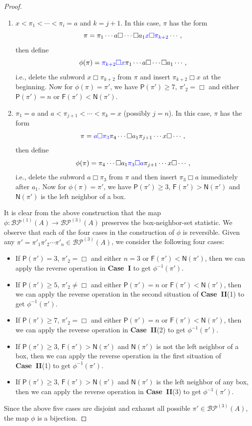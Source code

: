 \documentclass[12pt]{amsart}
\numberwithin{equation}{section}
\def\blue{\textcolor{blue}}
\theoremstyle{plain}
\theoremstyle{definition}
\newcommand{\BP}{\mathcal{BP}}
\begin{document}
\begin{proof}
\begin{enumerate}
\item $x<\pi_1<\cdots<\pi_i=a$ and $k=j+1$. In this case, $\pi$ has the form
$$
\pi=\pi_1\cdots a\Box\cdots \Box a_1\blue{x\Box\pi_{k+2}}\cdots,
$$
then define 
$$
\phi(\pi)=\blue{\pi_{k+2}\Box x}\pi_1\cdots a\Box\cdots \Box a_1\cdots, 
$$
i.e., delete the subword $x\Box\pi_{k+2}$ from $\pi$  and insert $\pi_{k+2}\Box x$ at the beginning. Now for $\phi(\pi)=\pi'$, we have $\mathsf{P}(\pi')\geq7$, $\pi'_2=\Box$ and either $\mathsf{P}(\pi')=n$ or $\mathsf{F}(\pi')<\mathsf{N}(\pi')$. 
\item $\pi_1=a$ and $a<\pi_{j+1}<\cdots <\pi_k=x$ (possibly $j=n$). In this case, $\pi$ has the form
$$
\pi=\blue{a\Box\pi_3}\pi_4\cdots \Box a_1\pi_{j+1}\cdots x\Box\cdots,
$$
then define 
$$
\phi(\pi)=\pi_4\cdots \Box a_1\blue{\pi_3\Box a}\pi_{j+1}\cdots x\Box\cdots,
$$
i.e., delete the subword $a\Box\pi_3$ from $\pi$ and then insert $\pi_3\Box a$ immediately after $a_1$. Now for $\phi(\pi)=\pi'$, we have $\mathsf{P}(\pi')\geq3$, $\mathsf{F}(\pi')>\mathsf{N}(\pi')$ and $\mathsf{N}(\pi')$ is the left neighbor of a box. 
\end{enumerate}

It is clear from the above construction that the map $\phi:\BP^{(1)}(A)\rightarrow\BP^{(3)}(A)$ preserves the box-neighbor-set statistic. We observe that each of the four cases in the construction of  $\phi$ is reversible. Given any 
$\pi'=\pi'_1\pi'_2\cdots\pi'_n\in\BP^{(3)}(A)$, we consider  the following four cases:
\begin{itemize}
\item If $\mathsf{P}(\pi')=3$, $\pi'_2=\Box$ and either $n=3$ or $\mathsf{F}(\pi')<\mathsf{N}(\pi')$, then we can apply the reverse operation in {\bf Case~I} to get $\phi^{-1}(\pi')$. 
\item If $\mathsf{P}(\pi')\geq5$, $\pi'_2\neq\Box$ and either $\mathsf{P}(\pi')=n$ or $\mathsf{F}(\pi')<\mathsf{N}(\pi')$, then we can apply the reverse operation in the second situation of {\bf Case~II}(1) to get $\phi^{-1}(\pi')$.
\item If $\mathsf{P}(\pi')\geq7$, $\pi'_2=\Box$ and either $\mathsf{P}(\pi')=n$ or $\mathsf{F}(\pi')<\mathsf{N}(\pi')$, then we can apply the reverse operation in {\bf Case~II}(2) to get $\phi^{-1}(\pi')$.
\item If $\mathsf{P}(\pi')\geq3$, $\mathsf{F}(\pi')>\mathsf{N}(\pi')$ and $\mathsf{N}(\pi')$ is not the left neighbor of a box, then we can apply the reverse operation in the first situation of {\bf Case~II}(1) to get $\phi^{-1}(\pi')$.
\item If $\mathsf{P}(\pi')\geq3$, $\mathsf{F}(\pi')>\mathsf{N}(\pi')$ and $\mathsf{N}(\pi')$ is the left neighbor of any box,  then we can apply the reverse operation in {\bf Case~II}(3) to get $\phi^{-1}(\pi')$.
\end{itemize}
Since the above five cases are disjoint and exhaust all possible $\pi'\in\BP^{(3)}(A)$, the map $\phi$ is a bijection.
\end{proof}
\end{document}
